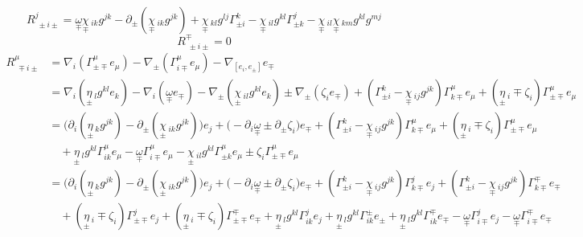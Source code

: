 \documentclass[a4paper,11pt]{article}
\numberwithin{equation}{section}
\theoremstyle{definition}
\begin{document}
\begin{equation}
    \boxed{R^j_{\;\pm i\pm} =
    \underset{\mp}{\omega}\underset{\mp}{\chi}\,_{ik}g^{jk}- \partial_\pm( \underset{\mp}{\chi}\,_{ik}g^{jk}) + \underset{\mp}{\chi}\,_{kl}g^{lj}\Gamma_{\pm i}^k - \underset{\mp}{\chi}\,_{il}g^{kl}\Gamma_{\pm k}^j - \underset{\mp}{\chi}\,_{il}\underset{\mp}{\chi}\,_{km}g^{kl}g^{mj}}
\end{equation}
\begin{equation}
    \boxed{R^\mp_{\;\pm i\pm} = 0}
\end{equation}
\begin{align*}
    R^\mu_{\;\mp i\pm} &= \nabla_i (\Gamma_{\pm\mp}^\mu e_\mu) - \nabla_\pm (\Gamma_{i\mp}^\mu e_\mu) - \nabla_{[e_i,e_\pm]} e_\mp\\
    &=\nabla_i (\underset{\pm}{\eta}\,_lg^{kl} e_k)-\nabla_i (\underset{\mp}{\omega} e_\mp) - \nabla_\pm (\underset{\pm}{\chi}\,_{il}g^{kl} e_k)\pm \nabla_\pm (\zeta_i e_\mp) + (\Gamma_{\pm i}^k - \underset{\mp}{\chi}\,_{ij}g^{jk})\Gamma_{k\mp}^\mu e_\mu+(\underset{\pm}{\eta}\,_i \mp \zeta_i)\Gamma_{\pm\mp}^\mu e_\mu\\
    &=\Big(\partial_i (\underset{\pm}{\eta}\,_kg^{jk}) - \partial_\pm (\underset{\pm}{\chi}\,_{ik}g^{jk}) \Big)e_j + \Big(-\partial_i \underset{\mp}{\omega} \pm \partial_\pm \zeta_i \Big)e_\mp + (\Gamma_{\pm i}^k - \underset{\mp}{\chi}\,_{ij}g^{jk})\Gamma_{k\mp}^\mu e_\mu+(\underset{\pm}{\eta}\,_i \mp \zeta_i)\Gamma_{\pm\mp}^\mu e_\mu\\
    &\quad +\underset{\pm}{\eta}\,_lg^{kl} \Gamma_{i k}^\mu e_\mu-\underset{\mp}{\omega} \Gamma_{i \mp}^\mu e_\mu - \underset{\pm}{\chi}\,_{il}g^{kl}\Gamma_{\pm k}^\mu e_\mu \pm \zeta_i\Gamma_{\pm\mp}^\mu e_\mu\\
    &=\Big(\partial_i (\underset{\pm}{\eta}\,_kg^{jk}) - \partial_\pm (\underset{\pm}{\chi}\,_{ik}g^{jk}) \Big)e_j + \Big(-\partial_i \underset{\mp}{\omega} \pm \partial_\pm \zeta_i \Big)e_\mp + (\Gamma_{\pm i}^k - \underset{\mp}{\chi}\,_{ij}g^{jk})\Gamma_{k\mp}^j e_j+ (\Gamma_{\pm i}^k - \underset{\mp}{\chi}\,_{ij}g^{jk})\Gamma_{k\mp}^\mp e_\mp\\
    &\quad +(\underset{\pm}{\eta}\,_i \mp \zeta_i)\Gamma_{\pm\mp}^j e_j +(\underset{\pm}{\eta}\,_i \mp \zeta_i)\Gamma_{\pm\mp}^\mp e_\mp +\underset{\pm}{\eta}\,_lg^{kl} \Gamma_{i k}^j e_j+\underset{\pm}{\eta}\,_lg^{kl} \Gamma_{i k}^\pm e_\pm+\underset{\pm}{\eta}\,_lg^{kl} \Gamma_{i k}^\mp e_\mp-\underset{\mp}{\omega} \Gamma_{i \mp}^j e_j-\underset{\mp}{\omega} \Gamma_{i \mp}^\mp e_\mp\\

\end{align*}
\end{document}

